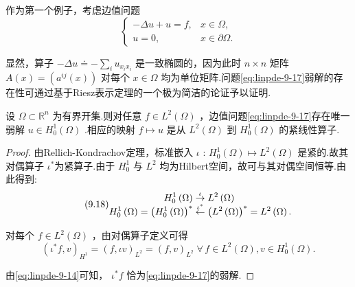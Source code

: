 作为第一个例子，考虑边值问题
\begin{equation}\tag{9.17}\label{eq:linpde-9-17}
\begin{cases}  - {\Delta u} + u   = f, & x \in  \Omega , \\[-3pt]  u  = 0, & x \in  \partial \Omega . \end{cases}
\end{equation}

显然，算子 $- {\Delta u} \doteq   - \sum_{i}{u}_{{x}_{i}{x}_{i}}$ 是一致椭圆的，因为此时 $n \times  n$ 矩阵 $A\left( x\right)  = \left( {{a}^{ij}\left( x\right) }\right)$ 对每个 $x \in  \Omega$ 均为单位矩阵.问题\eqref{eq:linpde-9-17}弱解的存在性可通过基于Riesz表示定理的一个极为简洁的论证予以证明.

\begin{lemma}\label{lem:linpde-9-7}
设 $\Omega  \subset  {\mathbb{R}}^{n}$ 为有界开集.则对任意 $f \in  {L}^{2}\left( \Omega \right)$ ，边值问题\eqref{eq:linpde-9-17}存在唯一弱解 $u \in  {H}_{0}^{1}\left( \Omega \right)$ .相应的映射 $f \mapsto  u$ 是从 ${L}^{2}\left( \Omega \right)$ 到 ${H}_{0}^{1}\left( \Omega \right)$ 的紧线性算子.
\end{lemma}

\begin{proof}
由Rellich-Kondrachov定理，标准嵌入 $\iota$ : ${H}_{0}^{1}\left( \Omega \right)  \mapsto  {L}^{2}\left( \Omega \right)$ 是紧的.故其对偶算子 ${\iota }^{ * }$为紧算子.由于 ${H}_{0}^{1}$ 与 ${L}^{2}$ 均为Hilbert空间，故可与其对偶空间恒等.由此得到:
\begin{equation}\tag{9.18}\label{eq:linpde-9-18}
\setjot[-2]\begin{aligned}
{H}_{0}^{1}\left( \Omega \right) &\overset{\iota }{ \rightarrow  }{L}^{2}\left( \Omega \right)\\
{H}_{0}^{1}\left( \Omega \right)  = {\left(  {H}_{0}^{1}\left( \Omega \right) \right)  }^{ * } &\overset{{\iota }^{ * }}{ \leftarrow  }{\left(  {L}^{2}\left( \Omega \right) \right)  }^{ * } = {L}^{2}\left( \Omega \right) .
\end{aligned}
\end{equation}

对每个 $f \in  {L}^{2}\left( \Omega \right)$ ，由对偶算子定义可得
\[
{\left( {\iota }^{ * }f,v\right) }_{{H}^{1}} = {\left( f,\iota v\right) }_{{L}^{2}} = {\left( f,v\right) }_{{L}^{2}}\;\forall\,f \in  {L}^{2}\left( \Omega \right) ,v \in  {H}_{0}^{1}\left( \Omega \right) .
\]

由\eqref{eq:linpde-9-14}可知， ${\iota }^{ * }f$ 恰为\eqref{eq:linpde-9-17}的弱解.
\end{proof}


